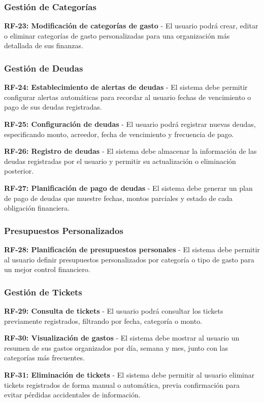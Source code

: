 \subsubsection{Gestión de Categorías}
\textbf{RF-23: Modificación de categorías de gasto} - El usuario podrá crear, editar o eliminar categorías de gasto personalizadas para una organización más detallada de sus finanzas.

\subsubsection{Gestión de Deudas}
\textbf{RF-24: Establecimiento de alertas de deudas} - El sistema debe permitir configurar alertas automáticas para recordar al usuario fechas de vencimiento o pago de sus deudas registradas.

\textbf{RF-25: Configuración de deudas} - El usuario podrá registrar nuevas deudas, especificando monto, acreedor, fecha de vencimiento y frecuencia de pago.

\textbf{RF-26: Registro de deudas} - El sistema debe almacenar la información de las deudas registradas por el usuario y permitir su actualización o eliminación posterior.

\textbf{RF-27: Planificación de pago de deudas} - El sistema debe generar un plan de pago de deudas que muestre fechas, montos parciales y estado de cada obligación financiera.

\subsubsection{Presupuestos Personalizados}
\textbf{RF-28: Planificación de presupuestos personales} - El sistema debe permitir al usuario definir presupuestos personalizados por categoría o tipo de gasto para un mejor control financiero.

\subsubsection{Gestión de Tickets}
\textbf{RF-29: Consulta de tickets} - El usuario podrá consultar los tickets previamente registrados, filtrando por fecha, categoría o monto.

\textbf{RF-30: Visualización de gastos} - El sistema debe mostrar al usuario un resumen de sus gastos organizados por día, semana y mes, junto con las categorías más frecuentes.

\textbf{RF-31: Eliminación de tickets} - El sistema debe permitir al usuario eliminar tickets registrados de forma manual o automática, previa confirmación para evitar pérdidas accidentales de información.

